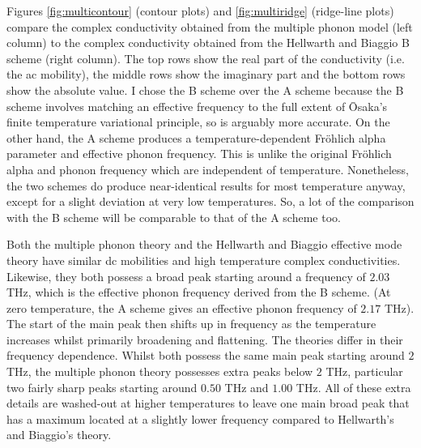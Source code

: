 Figures \ref{fig:multicontour} (contour plots) and \ref{fig:multiridge} (ridge-line plots) compare the complex conductivity obtained from the multiple phonon model (left column) to the complex conductivity obtained from the Hellwarth and Biaggio B scheme (right column). The top rows show the real part of the conductivity (i.e. the ac mobility), the middle rows show the imaginary part and the bottom rows show the absolute value. I chose the B scheme over the A scheme because the B scheme involves matching an effective frequency to the full extent of \=Osaka's finite temperature variational principle, so is arguably more accurate. On the other hand, the A scheme produces a temperature-dependent Fr\"ohlich alpha parameter and effective phonon frequency. This is unlike the original Fr\"ohlich alpha and phonon frequency which are independent of temperature. Nonetheless, the two schemes do produce near-identical results for most temperature anyway, except for a slight deviation at very low temperatures. So, a lot of the comparison with the B scheme will be comparable to that of the A scheme too. 

Both the multiple phonon theory and the Hellwarth and Biaggio effective mode theory have similar dc mobilities and high temperature complex conductivities. Likewise, they both possess a broad peak starting around a frequency of $2.03$ THz, which is the effective phonon frequency derived from the B scheme. (At zero temperature, the A scheme gives an effective phonon frequency of $2.17$ THz). The start of the main peak then shifts up in frequency as the temperature increases whilst primarily broadening and flattening. The theories differ in their frequency dependence. Whilst both possess the same main peak starting around $2$ THz, the multiple phonon theory possesses extra peaks below $2$ THz, particular two fairly sharp peaks starting around $0.50$ THz and $1.00$ THz. All of these extra details are washed-out at higher temperatures to leave one main broad peak that has a maximum located at a slightly lower frequency compared to Hellwarth's and Biaggio's theory.


